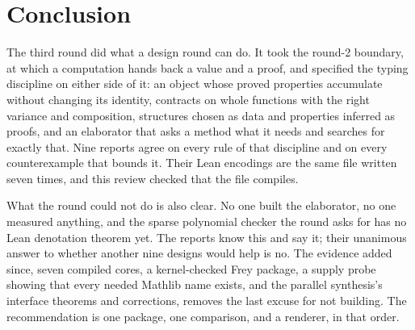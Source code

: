 \documentclass[11pt,a4paper]{article}
\theoremstyle{definition}
\begin{document}
\section{Conclusion}
The third round did what a design round can do. It took the round-2 boundary, at which a computation hands back a value and a proof, and specified the typing discipline on either side of it: an object whose proved properties accumulate without changing its identity, contracts on whole functions with the right variance and composition, structures chosen as data and properties inferred as proofs, and an elaborator that asks a method what it needs and searches for exactly that. Nine reports agree on every rule of that discipline and on every counterexample that bounds it. Their Lean encodings are the same file written seven times, and this review checked that the file compiles.

What the round could not do is also clear. No one built the elaborator, no one measured anything, and the sparse polynomial checker the round asks for has no Lean denotation theorem yet. The reports know this and say it; their unanimous answer to whether another nine designs would help is no. The evidence added since, seven compiled cores, a kernel-checked Frey package, a supply probe showing that every needed Mathlib name exists, and the parallel synthesis's interface theorems and corrections, removes the last excuse for not building. The recommendation is one package, one comparison, and a renderer, in that order.

\clearpage
\appendix

\end{document}
